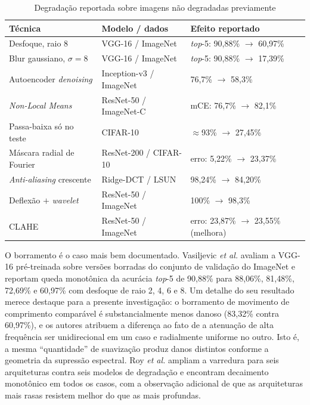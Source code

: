\documentclass[conference]{IEEEtran}
\begin{document}
\begin{table}[htbp]
\caption{Degradação reportada sobre imagens não degradadas previamente}
\begin{center}
\footnotesize
\begin{tabular}{|p{2.0cm}|p{2.0cm}|p{2.6cm}|}
\hline
\textbf{Técnica} & \textbf{Modelo / dados} & \textbf{Efeito reportado} \\
\hline
Desfoque, raio 8 \cite{b4} & VGG-16 / ImageNet & \textit{top}-5: 90,88\%
$\rightarrow$ 60,97\% \\
\hline
Blur gaussiano, $\sigma=8$ \cite{b4} & VGG-16 / ImageNet & \textit{top}-5:
90,88\% $\rightarrow$ 17,39\% \\
\hline
Autoencoder \textit{denoising} \cite{b7} & Inception-v3 / ImageNet & 76,7\%
$\rightarrow$ 58,3\% \\
\hline
\textit{Non-Local Means} \cite{b6} & ResNet-50 / ImageNet-C & mCE: 76,7\%
$\rightarrow$ 82,1\% \\
\hline
Passa-baixa só no teste \cite{b23} & CIFAR-10 & $\approx$93\% $\rightarrow$
27,45\% \\
\hline
Máscara radial de Fourier \cite{b14} & ResNet-200 / CIFAR-10 & erro: 5,22\%
$\rightarrow$ 23,37\% \\
\hline
\textit{Anti-aliasing} crescente \cite{b21} & Ridge-DCT / LSUN & 98,24\%
$\rightarrow$ 84,20\% \\
\hline
Deflexão $+$ \textit{wavelet} \cite{b11} & ResNet-50 / ImageNet & 100\%
$\rightarrow$ 98,3\% \\
\hline
CLAHE \cite{b6} & ResNet-50 / ImageNet & erro: 23,87\% $\rightarrow$ 23,55\%
(melhora) \\
\hline
\end{tabular}
\label{tab:magnitudes}
\end{center}
\end{table}

O borramento é o caso mais bem documentado. Vasiljevic \textit{et al.}
\cite{b4} avaliam a VGG-16 pré-treinada sobre versões borradas do conjunto de
validação do ImageNet e reportam queda monotônica da acurácia \textit{top}-5 de
90,88\% para 88,06\%, 81,48\%, 72,69\% e 60,97\% com desfoque de raio 2, 4, 6 e
8. Um detalhe do seu resultado merece destaque para a presente investigação: o
borramento de movimento de comprimento comparável é substancialmente menos
danoso (83,32\% contra 60,97\%), e os autores atribuem a diferença ao fato de a
atenuação de alta frequência ser unidirecional em um caso e radialmente
uniforme no outro. Isto é, a mesma ``quantidade'' de suavização produz danos
distintos conforme a geometria da supressão espectral. Roy \textit{et al.}
\cite{b5} ampliam a varredura para seis arquiteturas contra seis modelos de
degradação e encontram decaimento monotônico em todos os casos, com a
observação adicional de que as arquiteturas mais rasas resistem melhor do que
as mais profundas.
\end{document}
